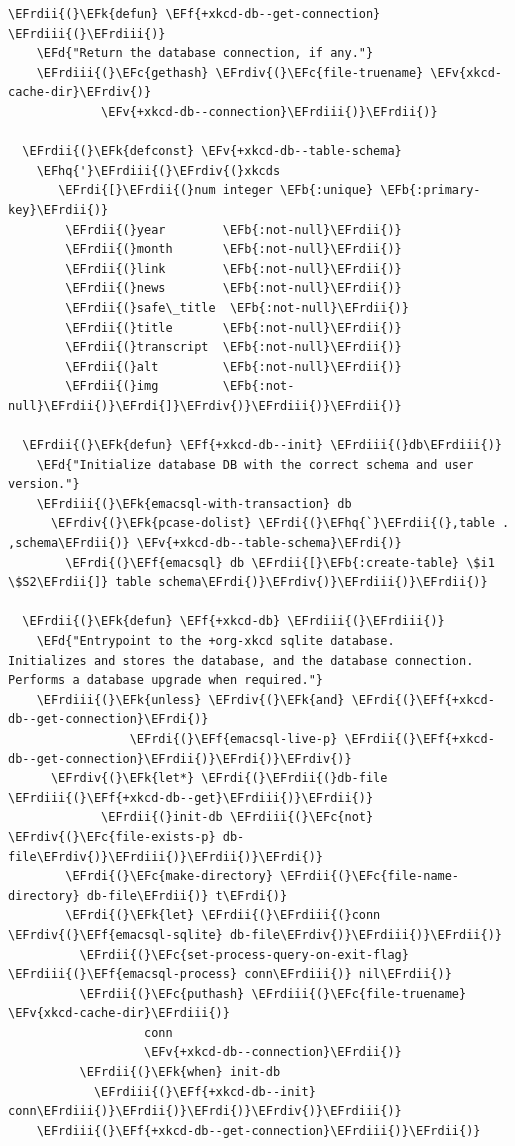 \documentclass{scrartcl}
\newcommand{\EFk}[1]{\textcolor{EFk}{#1}} %
\newcommand{\EFd}[1]{\textcolor{EFd}{#1}} %
\newcommand{\EFb}[1]{\textcolor{EFb}{#1}} %
\newcommand{\EFc}[1]{\textcolor{EFc}{#1}} %
\newcommand{\EFv}[1]{\textcolor{EFv}{#1}} %
\newcommand{\EFf}[1]{\textcolor{EFf}{#1}} %
\newcommand{\EFhq}[1]{#1} %
\newcommand{\EFrdi}[1]{#1} %
\newcommand{\EFrdii}[1]{#1} %
\newcommand{\EFrdiii}[1]{#1} %
\newcommand{\EFrdiv}[1]{#1} %
\begin{document}
\begin{Code}
\begin{Verbatim}[]
  \EFrdii{(}\EFk{defun} \EFf{+xkcd-db--get-connection} \EFrdiii{(}\EFrdiii{)}
    \EFd{"Return the database connection, if any."}
    \EFrdiii{(}\EFc{gethash} \EFrdiv{(}\EFc{file-truename} \EFv{xkcd-cache-dir}\EFrdiv{)}
             \EFv{+xkcd-db--connection}\EFrdiii{)}\EFrdii{)}

  \EFrdii{(}\EFk{defconst} \EFv{+xkcd-db--table-schema}
    \EFhq{'}\EFrdiii{(}\EFrdiv{(}xkcds
       \EFrdi{[}\EFrdii{(}num integer \EFb{:unique} \EFb{:primary-key}\EFrdii{)}
        \EFrdii{(}year        \EFb{:not-null}\EFrdii{)}
        \EFrdii{(}month       \EFb{:not-null}\EFrdii{)}
        \EFrdii{(}link        \EFb{:not-null}\EFrdii{)}
        \EFrdii{(}news        \EFb{:not-null}\EFrdii{)}
        \EFrdii{(}safe\_title  \EFb{:not-null}\EFrdii{)}
        \EFrdii{(}title       \EFb{:not-null}\EFrdii{)}
        \EFrdii{(}transcript  \EFb{:not-null}\EFrdii{)}
        \EFrdii{(}alt         \EFb{:not-null}\EFrdii{)}
        \EFrdii{(}img         \EFb{:not-null}\EFrdii{)}\EFrdi{]}\EFrdiv{)}\EFrdiii{)}\EFrdii{)}

  \EFrdii{(}\EFk{defun} \EFf{+xkcd-db--init} \EFrdiii{(}db\EFrdiii{)}
    \EFd{"Initialize database DB with the correct schema and user version."}
    \EFrdiii{(}\EFk{emacsql-with-transaction} db
      \EFrdiv{(}\EFk{pcase-dolist} \EFrdi{(}\EFhq{`}\EFrdii{(},table . ,schema\EFrdii{)} \EFv{+xkcd-db--table-schema}\EFrdi{)}
        \EFrdi{(}\EFf{emacsql} db \EFrdii{[}\EFb{:create-table} \$i1 \$S2\EFrdii{]} table schema\EFrdi{)}\EFrdiv{)}\EFrdiii{)}\EFrdii{)}

  \EFrdii{(}\EFk{defun} \EFf{+xkcd-db} \EFrdiii{(}\EFrdiii{)}
    \EFd{"Entrypoint to the +org-xkcd sqlite database.
Initializes and stores the database, and the database connection.
Performs a database upgrade when required."}
    \EFrdiii{(}\EFk{unless} \EFrdiv{(}\EFk{and} \EFrdi{(}\EFf{+xkcd-db--get-connection}\EFrdi{)}
                 \EFrdi{(}\EFf{emacsql-live-p} \EFrdii{(}\EFf{+xkcd-db--get-connection}\EFrdii{)}\EFrdi{)}\EFrdiv{)}
      \EFrdiv{(}\EFk{let*} \EFrdi{(}\EFrdii{(}db-file \EFrdiii{(}\EFf{+xkcd-db--get}\EFrdiii{)}\EFrdii{)}
             \EFrdii{(}init-db \EFrdiii{(}\EFc{not} \EFrdiv{(}\EFc{file-exists-p} db-file\EFrdiv{)}\EFrdiii{)}\EFrdii{)}\EFrdi{)}
        \EFrdi{(}\EFc{make-directory} \EFrdii{(}\EFc{file-name-directory} db-file\EFrdii{)} t\EFrdi{)}
        \EFrdi{(}\EFk{let} \EFrdii{(}\EFrdiii{(}conn \EFrdiv{(}\EFf{emacsql-sqlite} db-file\EFrdiv{)}\EFrdiii{)}\EFrdii{)}
          \EFrdii{(}\EFc{set-process-query-on-exit-flag} \EFrdiii{(}\EFf{emacsql-process} conn\EFrdiii{)} nil\EFrdii{)}
          \EFrdii{(}\EFc{puthash} \EFrdiii{(}\EFc{file-truename} \EFv{xkcd-cache-dir}\EFrdiii{)}
                   conn
                   \EFv{+xkcd-db--connection}\EFrdii{)}
          \EFrdii{(}\EFk{when} init-db
            \EFrdiii{(}\EFf{+xkcd-db--init} conn\EFrdiii{)}\EFrdii{)}\EFrdi{)}\EFrdiv{)}\EFrdiii{)}
    \EFrdiii{(}\EFf{+xkcd-db--get-connection}\EFrdiii{)}\EFrdii{)}


\end{Verbatim}
\end{Code}
\end{document}
